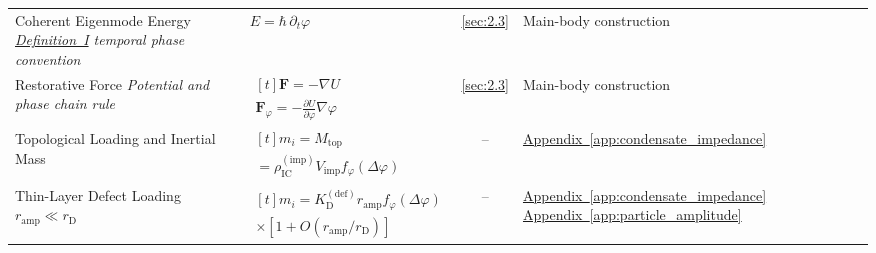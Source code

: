 \begin{longtable}{@{} p{4.5cm} p{6cm} c p{4cm} @{}}
{\raggedright Coherent Eigenmode Energy \newline \textit{\hyperref[def:definition_one]{Definition~I} temporal phase convention}\par} & {\raggedright $E=\hbar\,\partial_t\varphi$\par} & \hyperref[sec:2.3]{\ref*{sec:2.3}} & {\raggedright Main-body construction\par} \\

{\raggedright Restorative Force \newline \textit{Potential and phase chain rule}\par} & {\raggedright $\begin{gathered}[t]\mathbf F=-\nabla U \\ \mathbf F_\varphi=-\frac{\partial U}{\partial\varphi}\nabla\varphi\end{gathered}$\par} & \hyperref[sec:2.3]{\ref*{sec:2.3}} & {\raggedright Main-body construction\par} \\

{\raggedright Topological Loading and Inertial Mass\par} & {\raggedright $\begin{gathered}[t]m_i=M_{\mathrm{top}} \\ =\rho_{\mathrm{IC}}^{(\mathrm{imp})}V_{\mathrm{imp}}f_\varphi(\Delta\varphi)\end{gathered}$\par} & -- & {\raggedright \hyperref[app:condensate_impedance]{Appendix~\ref*{app:condensate_impedance}}\par} \\

{\raggedright Thin-Layer Defect Loading \newline \textit{$r_{\mathrm{amp}}\ll r_{\mathrm D}$}\par} & {\raggedright $\begin{gathered}[t]m_i=K_{\mathrm D}^{(\mathrm{def})}r_{\mathrm{amp}}f_\varphi(\Delta\varphi) \\ \times[1+O(r_{\mathrm{amp}}/r_{\mathrm D})]\end{gathered}$\par} & -- & {\raggedright \hyperref[app:condensate_impedance]{Appendix~\ref*{app:condensate_impedance}} \newline \hyperref[app:particle_amplitude]{Appendix~\ref*{app:particle_amplitude}}\par} \\


\end{longtable}

